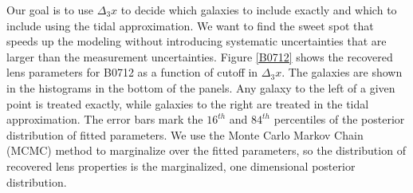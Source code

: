 Our goal is to use $\Delta_3x$ to decide which galaxies to include exactly and which to include using the tidal approximation. We want to find the sweet spot that speeds up the modeling without introducing systematic uncertainties that are larger than the measurement uncertainties.
Figure \ref{B0712} shows the recovered lens parameters for B0712 as a function of cutoff in $\Delta_3x$. The galaxies are shown in the histograms in the bottom of the panels. Any galaxy to the left of a given point is treated exactly, while galaxies to the right are treated in the tidal approximation. The error bars mark the $16^{th}$ and $84^{th}$ percentiles of the posterior distribution of fitted parameters. We use the Monte Carlo Markov Chain (MCMC) method to marginalize over the fitted parameters, so the distribution of recovered lens properties is the marginalized, one dimensional posterior distribution.